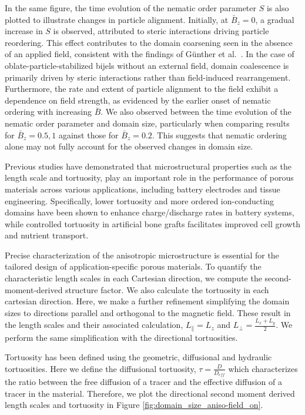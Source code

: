 In the same figure, the time evolution of the nematic order parameter $S$ is also plotted to illustrate changes in particle alignment.
Initially, at $\bar{B}_z = 0$, a gradual increase in $S$ is observed, attributed to steric interactions driving particle reordering.
This effect contributes to the domain coarsening seen in the absence of an applied field, consistent with the findings of Günther et
al.~\cite{gunther_timescales_2014}. In the case of oblate-particle-stabilized bijels without an external field, domain
coalescence is primarily driven by steric interactions rather than field-induced rearrangement. Furthermore, the rate and extent of
particle alignment to the field exhibit a dependence on field strength, as evidenced by the earlier onset of nematic ordering with increasing
$\bar{B}$. We also observed between the time evolution of the nematic order parameter and domain size, particularly when comparing results for
$\bar{B}_z = 0.5, 1$ against those for $\bar{B}_z = 0.2$. This suggests that nematic ordering alone may not fully account for the
observed changes in domain size.

Previous studies have demonstrated that microstructural properties such as the length scale and tortuosity, play an important role in the
performance of porous materials across various applications, including battery electrodes and tissue engineering. \cite{zhang_promoting_2019}
\cite{ebner_tortuosity_2014} \cite{hsieh_architected_2021} Specifically, lower tortuosity and more ordered ion-conducting domains have been shown
to enhance charge/discharge rates in battery systems, while controlled tortuosity in artificial bone grafts facilitates improved cell growth
and nutrient transport.

Precise characterization of the anisotropic microstructure is essential for the tailored design of application-specific porous materials. To
quantify the characteristic length scales in each Cartesian direction, we compute the second-moment-derived structure factor. \cite{jansen_bijels_2011} 
We also calculate the tortuosity  in each cartesian direction. Here, we make a further
refinement simplifying the domain sizes to directions parallel and orthogonal to the magnetic field. These result in the length scales and
their associated calculation, $L_{\parallel} = L_{z}$ and $L_{\perp} = \frac{L_x + L_y}{2}$. We perform the same simplification
with the directional tortuosities.

Tortuosity has been defined using the geometric, diffusional and hydraulic tortuosities. Here we define
the diffusional tortuosity, $\tau = \frac{D}{D_{eff}}$ which characterizes the ratio between the free diffusion of a tracer and the
effective diffusion of a tracer in the material. Therefore, we plot the directional second moment derived length scales and tortuosity in
Figure \ref{fig:domain_size_aniso-field_on}.

